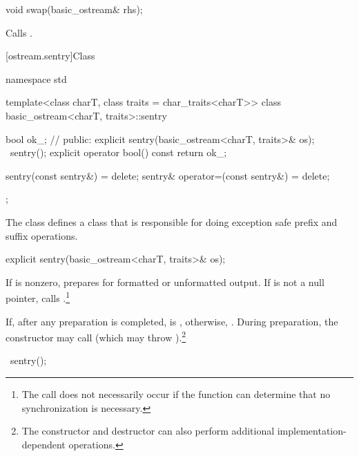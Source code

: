 %
\begin{itemdecl}
void swap(basic_ostream& rhs);
\end{itemdecl}

\begin{itemdescr}
\pnum
\effects
Calls .
\end{itemdescr}

[ostream.sentry]{Class }

%
%
\begin{codeblock}
namespace std {
  template<class charT, class traits = char_traits<charT>>
  class basic_ostream<charT, traits>::sentry {
    bool ok_;       // \expos
  public:
    explicit sentry(basic_ostream<charT, traits>& os);
    ~sentry();
    explicit operator bool() const { return ok_; }

    sentry(const sentry&) = delete;
    sentry& operator=(const sentry&) = delete;
  };
}
\end{codeblock}

\pnum
The class
defines a class that is responsible for doing exception safe prefix and suffix
operations.

%
\begin{itemdecl}
explicit sentry(basic_ostream<charT, traits>& os);
\end{itemdecl}

\begin{itemdescr}
\pnum
If
is nonzero, prepares for formatted or unformatted output.
If
is not a null pointer, calls
%
.\footnote{The call
does not necessarily occur if the function can determine that no
synchronization is necessary.}

\pnum
If, after any preparation is completed,
is
,
otherwise,
.
During preparation, the constructor may call
(which may throw
).\footnote{The
constructor and destructor
can also perform additional
%
implementation-dependent operations.}
\end{itemdescr}

%
\begin{itemdecl}
~sentry();
\end{itemdecl}

